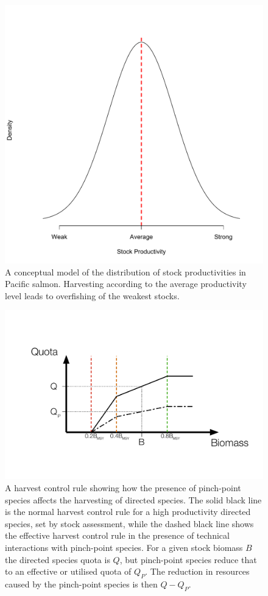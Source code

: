 \documentclass[]{scrartcl}
\begin{document}
\newpage

\begin{figure}[htbp]
\centering
\includegraphics{figures/WeakStrongDist.pdf}
\caption{A conceptual model of the distribution of stock productivities in Pacific salmon. Harvesting according to the average productivity level leads to overfishing of the weakest stocks.}\label{fig:ppHCR}
\end{figure}

\newpage

\begin{figure}[htbp]
\centering
\includegraphics{figures/ppHCR.pdf}
\caption{A harvest control rule showing how the presence of pinch-point species affects the harvesting of directed species. The solid black line is the normal harvest control rule for a high productivity directed species, set by stock assessment, while the dashed black line shows the effective harvest control rule in the presence of technical interactions with pinch-point species. For a given stock biomass $B$ the directed species quota is $Q$, but pinch-point species reduce that to an effective or utilised quota of $Q_P$. The reduction in resources caused by the pinch-point species is then $Q - Q_P$.}\label{fig:ppHCR}
\end{figure}
\end{document}
